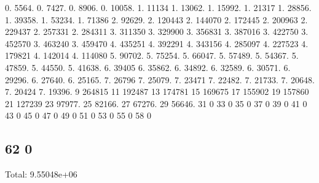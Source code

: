 0. 5564. 0. 7427. 0. 8906. 0. 10058. 1. 11134 1. 13062. 1. 15992. 1. 21317 1. 28856. 1. 39358. 1. 53234. 1. 71386 2. 92629. 2. 120443 2. 144070 2. 172445 2. 200963 2. 229437 2. 257331 2. 284311 3. 311350 3. 329900 3. 356831 3. 387016 3. 422750 3. 452570 3. 463240 3. 459470 4. 435251 4. 392291 4. 343156 4. 285097 4. 227523 4. 179821 4. 142014 4. 114080 5. 90702. 5. 75254. 5. 66047. 5. 57489. 5. 54367. 5. 47859. 5. 44550. 5. 41638. 6. 39405 6. 35862. 6. 34892. 6. 32589. 6. 30571. 6. 29296. 6. 27640. 6. 25165. 7. 26796 7. 25079. 7. 23471 7. 22482. 7. 21733. 7. 20648. 7. 20424 7. 19396. 9 264815 11 192487 13 174781 15 169675 17 155902 19 157860 21 127239 23 97977. 25 82166. 27 67276. 29 56646. 31 0 33 0 35 0 37 0 39 0 41 0 43 0 45 0 47 0 49 0 51 0 53 0 55 0 58 0 \subsection*{62 0 }

Total\+: 9.\+55048e+06 